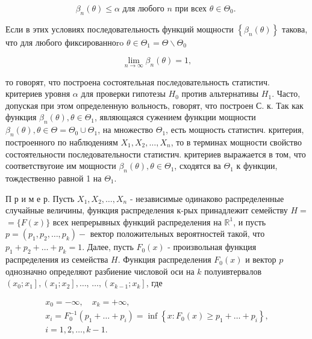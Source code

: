 \documentclass[10pt]{article}
\begin{document}
\[

\beta_{n}(\theta) \leqslant \alpha \text { для любого } n \text { при всех } \theta \in \Theta_{0} \text {. }

\]



Если в этих условиях последовательность функций мощности $\left\{\beta_{n}(\theta)\right\}$ такова, что для любого фиксированноro $\theta \in \Theta_{1}=\Theta \backslash \Theta_{0}$



\[

\lim _{n \rightarrow \infty} \beta_{n}(\theta)=1,

\]



то говорят, что построена состоятельная последовательность статистич. критериев уровня $\alpha$ для проверки гипотезы $H_{0}$ против альтернативы $H_{1}$. Часто, допуская при этом определенную вольность, говорят, что построен С. к. Так как функция $\beta_{n}(\theta), \theta \in \Theta_{1}$, являющаяся сужением функции мощности $\beta_{n}(\theta), \theta \in \Theta=\Theta_{0} \cup \Theta_{1}$, на множество $\Theta_{1}$, есть мощность статистич. критерия, построенного по наблюдениям $X_{1}, X_{2}, \ldots, X_{n}$, то в терминах мощности свойство состоятельности последовательности статистич. критериев выражается в том, что соответствугоие им мощности $\beta_{n}(\theta), \theta \in \Theta_{1}$, сходятся ва $\Theta_{1}$ к функции, тождественно равной 1 на $\Theta_{1}$.



П р и м е р. Пусть $X_{1}, X_{2}, \ldots, X_{n}$ - независимые одинаково распределенные случайные величины, функция распределения к-рых принадлежит семейству $H=$ $=\{F(x)\}$ всех непрерывных функций распределения на $\mathbb{R}^{1}$, и пусть $p=\left(p_{1}, p_{2}, \ldots, p_{k}\right)-$ вектор положительных вероятностей такой, что $p_{1}+p_{2}+\ldots+p_{k}=1$. Далее, пусть $F_{0}(x)$ - произвольная функция распределения из семейства $H$. Функция распределения $F_{0}(x)$ и вектор $p$ однозначно определяют разбиение числовой оси на $k$ полуивтервалов $\left(x_{0} ; x_{1}\right],\left(x_{1} ; x_{2}\right], \ldots$, $\ldots,\left(x_{k-1} ; x_{k}\right]$, где



\[

\begin{gathered}

x_{0}=-\infty, \quad x_{k}=+\infty, \\

x_{i}=F_{0}^{-1}\left(p_{1}+\ldots+p_{i}\right)=\inf \left\{x: F_{0}(x) \geqslant p_{1}+\ldots+p_{i}\right\}, \\

i=1,2, \ldots, k-1 .

\end{gathered}

\]
\end{document}
